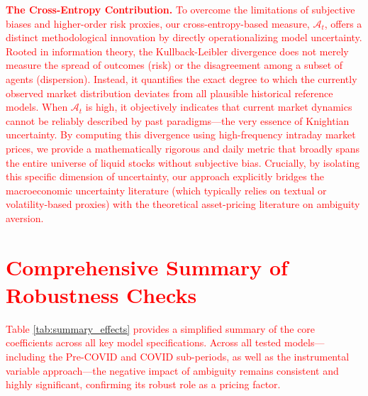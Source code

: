 \documentclass[preprint,12pt,authoryear]{elsarticle}
\begin{document}
\textcolor{red}{\textbf{The Cross-Entropy Contribution.} To overcome the limitations of subjective biases and higher-order risk proxies, our cross-entropy-based measure, $\mathcal{A}_t$, offers a distinct methodological innovation by directly operationalizing model uncertainty. Rooted in information theory, the Kullback-Leibler divergence does not merely measure the spread of outcomes (risk) or the disagreement among a subset of agents (dispersion). Instead, it quantifies the exact degree to which the currently observed market distribution deviates from all plausible historical reference models. When $\mathcal{A}_t$ is high, it objectively indicates that current market dynamics cannot be reliably described by past paradigms—the very essence of Knightian uncertainty. By computing this divergence using high-frequency intraday market prices, we provide a mathematically rigorous and daily metric that broadly spans the entire universe of liquid stocks without subjective bias. Crucially, by isolating this specific dimension of uncertainty, our approach explicitly bridges the macroeconomic uncertainty literature (which typically relies on textual or volatility-based proxies) with the theoretical asset-pricing literature on ambiguity aversion.}

\section{\textcolor{red}{Comprehensive Summary of Robustness Checks}}
\label{app:summary_effects}
\renewcommand{\theequation}{C.\arabic{equation}}
\setcounter{equation}{0}

\renewcommand{\thetable}{C.\arabic{table}}
\setcounter{table}{0}

\textcolor{red}{Table \ref{tab:summary_effects} provides a simplified summary of the core coefficients across all key model specifications. Across all tested models—including the Pre-COVID and COVID sub-periods, as well as the instrumental variable approach—the negative impact of ambiguity remains consistent and highly significant, confirming its robust role as a pricing factor.}
\end{document}
